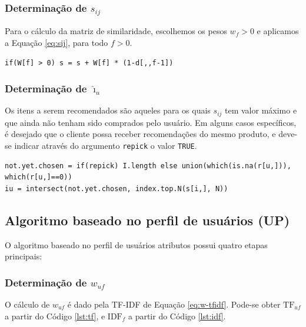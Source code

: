 \subsubsection{Determinação de  $s_{ij}$} %
\label{ssub:determina_o_de_s__ij_}

Para o cálculo da matriz de similaridade, escolhemos os pesos $w_f>0$ e aplicamos a Equação \ref{eq:sij}, para todo $f>0$.

\begin{lstlisting}[caption=Determinação de $s_{ij}$]
if(W[f] > 0) s = s + W[f] * (1-d[,,f-1])
\end{lstlisting}

\subsubsection{Determinação de $\hat{\imath}_u$} %
\label{ssub:determina_o_de_i_u_}

Os itens a serem recomendados são aqueles para os quais $s_{ij}$ tem valor máximo e que ainda não tenham sido comprados pelo usuário. Em alguns casos específicos, é desejado que o cliente possa receber recomendações do mesmo produto, e deve-se indicar através do argumento \texttt{repick} o valor \texttt{TRUE}.

\begin{lstlisting}[caption=Determinação de $\hat{\imath}_{u}$]
not.yet.chosen = if(repick) I.length else union(which(is.na(r[u,])), which(r[u,]==0))
iu = intersect(not.yet.chosen, index.top.N(s[i,], N))
\end{lstlisting}

\subsection{Algoritmo baseado no perfil de usuários (UP)} %
\label{sub:algoritmo_baseado_no_perfil_de_usu_rios_up_}

O algoritmo baseado no perfil de usuários atributos possui quatro etapas principais: 


\subsubsection{Determinação de $w_{uf}$} %
\label{ssub:determina_o_de_}

O cálculo de $w_{uf}$ é dado pela TF-IDF de Equação \ref{eq:w-tfidf}. Pode-se obter $\mathrm{TF}_{uf}$ a partir do Código \ref{lst:tf}, e $\mathrm{IDF}_{f}$ a partir do Código \ref{lst:idf}.



